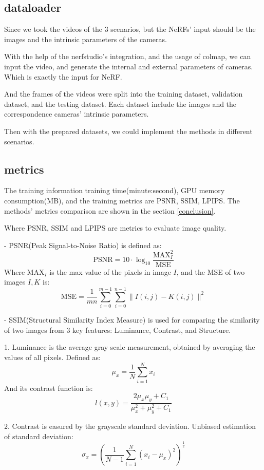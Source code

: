 \subsection{dataloader}
\label{data loader}

Since we took the videos of the $3$ scenarios, but the NeRFs' input should be the images and the intrinsic parameters of the cameras.

With the help of the nerfstudio's integration, and the usage of colmap, we can input the video, and generate the internal and external parameters of cameras. Which is exactly the input for NeRF.

And the frames of the videos were split into the training dataset, validation dataset, and the testing dataset. Each dataset include the images and the correspondence cameras' intrinsic parameters.

Then with the prepared datasets, we could implement the methods in different scenarios.

\subsection{metrics}
\label{metric}
The training information training time(minute:second),  GPU memory consumption(MB), and the training  metrics are PSNR, SSIM, LPIPS. The methods' metrics comparison are shown in the section \ref{conclusion}.

Where PSNR, SSIM and LPIPS are metrics to evaluate image quality.

- PSNR(Peak Signal-to-Noise Ratio) is defined as:
$$\text{PSNR}=10\cdot \log_{10}\dfrac{\text{MAX}_I^2}{\text{MSE}}$$
Where $\text{MAX}_I$ is the max value of the pixels in image $I$, and the MSE of two images $I,K$ is:
$$\text{MSE}=\dfrac{1}{mn}\sum_{i=0}^{m-1}\sum_{i=0}^{n-1}\|I(i,j)-K(i,j)\|^2$$

- SSIM(Structural Similarity Index Measure) is used for comparing the similarity of two images from $3$ key features: Luminance, Contrast, and Structure.

1. Luminance is the average gray scale measurement, obtained by averaging the values of all pixels. Defined as:
$$\mu_x=\frac{1}{N} \sum_{i=1}^N x_i$$
And its contrast function is:
$$l(x, y)=\frac{2 \mu_x \mu_y+C_1}{\mu_x^2+\mu_y^2+C_1}$$

2. Contrast is easured by the grayscale standard deviation. Unbiased estimation of standard deviation:
$$\sigma_x=\left(\frac{1}{N-1} \sum_{i=1}^N\left(x_i-\mu_x\right)^2\right)^{\frac{1}{2}}$$

